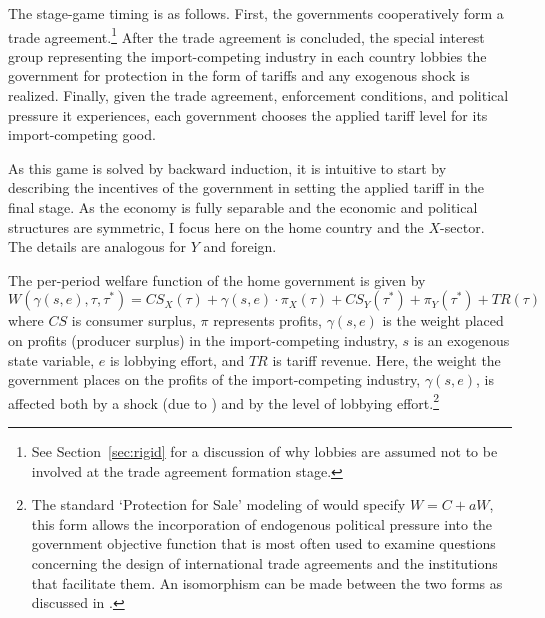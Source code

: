 \documentclass[12pt]{article}
\newtheorem{assumption}{Assumption}
\newcommand{\ga}{\gamma}
\begin{document}
The stage-game timing is as follows. First, the governments cooperatively form a trade agreement.\footnote{See Section~\ref{sec:rigid} for a discussion of why lobbies are assumed not to be involved at the trade agreement formation stage.} After the trade agreement is concluded, the special interest group representing the import-competing industry in each country lobbies the government for protection in the form of tariffs and any exogenous shock is realized. Finally, given the trade agreement, enforcement conditions, and political pressure it experiences, each government chooses the applied tariff level for its import-competing good.

As this game is solved by backward induction, it is intuitive to start by describing the incentives of the government in setting the applied tariff in the final stage. As the economy is fully separable and the economic and political structures are symmetric, I focus here on the home country and the $X$-sector. The details are analogous for $Y$ and foreign.

The per-period welfare function of the home government is given by
\begin{equation}
  W(\ga(s,e),\tau,\tau^*) = \mathit{CS}_X(\tau) + \ga(s,e) \cdot \pi_X(\tau) + \mathit{CS}_Y(\tau^*) + \pi_Y(\tau^*) + \mathit{TR}(\tau)
  \label{eq:wel}
\end{equation}
where $\mathit{CS}$ is consumer surplus, $\pi$ represents profits, $\ga(s,e)$ is the weight placed on profits (producer surplus) in the import-competing industry, $s$ is an exogenous state variable, $e$ is lobbying effort, and $\mathit{TR}$ is tariff revenue. Here, the weight the government places on the profits of the import-competing industry, $\ga(s,e)$, is affected both by a shock (due to \Textcite{ms2011}) and by the level of lobbying effort.\footnote{The standard `Protection for Sale' modeling of \Textcite{gh94} would specify $W = C + aW$, this form allows the incorporation of endogenous political pressure into the government objective function that is most often used to examine questions concerning the design of international trade agreements and the institutions that facilitate them. An isomorphism can be made between the two forms as discussed in \Textcite{buzard2013b}.}

\end{document}
